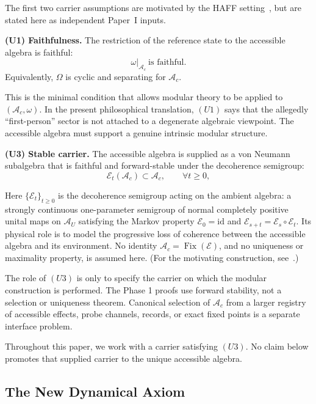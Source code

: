 \documentclass[12pt]{article}
\theoremstyle{definition}
\theoremstyle{remark}
\begin{document}
The first two carrier assumptions are motivated by the HAFF
setting~\cite{Liu2026PaperD}, but are stated here as independent Paper~I
inputs.

\textbf{(U1) Faithfulness.}
The restriction of the reference state to the accessible algebra is
faithful: \[
\omega|_{\mathcal{A}_c}\ \text{is faithful}.
\] Equivalently, \(\Omega\) is cyclic and separating for
\(\mathcal{A}_c\).

This is the minimal condition that allows modular theory to be applied
to \((\mathcal{A}_c,\omega)\). In the present philosophical translation,
\((U1)\) says that the allegedly ``first-person'' sector is not attached
to a degenerate algebraic viewpoint. The accessible algebra must support
a genuine intrinsic modular structure.

\textbf{(U3) Stable carrier.}
The accessible algebra is supplied as a von Neumann subalgebra that is
faithful and forward-stable under the decoherence semigroup: \[
\mathcal{E}_t(\mathcal{A}_c)\subset \mathcal{A}_c,
\qquad
\forall t\ge 0,
\]

Here \(\{\mathcal{E}_t\}_{t\ge 0}\) is the decoherence semigroup acting
on the ambient algebra: a strongly continuous one-parameter semigroup of
normal completely positive unital maps on \(\mathcal{A}_U\) satisfying
the Markov property \(\mathcal{E}_0=\mathrm{id}\) and
\(\mathcal{E}_{s+t}=\mathcal{E}_s\circ\mathcal{E}_t\). Its physical
role is to model the progressive loss of coherence between the
accessible algebra and its environment. No identity
\(\mathcal{A}_c=\operatorname{Fix}(\mathcal{E})\), and no uniqueness or
maximality property, is assumed here. (For the motivating construction,
see~\cite{Liu2026PaperD}.)

The role of \((U3)\) is only to specify the carrier on which the modular
construction is performed. The Phase 1 proofs use forward stability, not
a selection or uniqueness theorem. Canonical selection of
\(\mathcal{A}_c\) from a larger registry of accessible effects, probe
channels, records, or exact fixed points is a separate interface problem.

Throughout this paper, we work with a carrier satisfying \((U3)\). No
claim below promotes that supplied carrier to the unique accessible
algebra.

\subsection{The New Dynamical Axiom}\label{the-new-dynamical-axiom}
\end{document}
